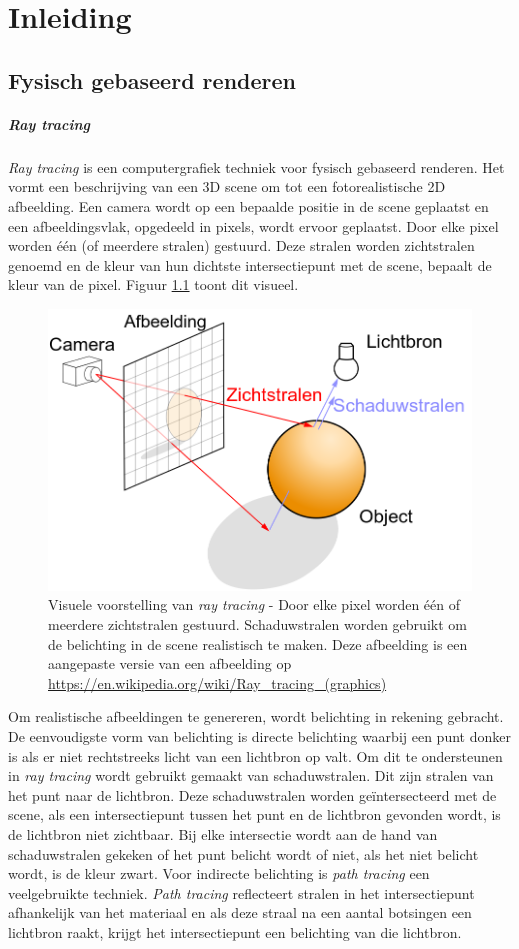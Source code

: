 \chapter{Inleiding}
\label{hoofdstuk:inleiding}

\section{Fysisch gebaseerd renderen}
\paragraph{Ray tracing}
\textit{Ray tracing} is een computergrafiek techniek voor fysisch gebaseerd renderen. Het vormt een beschrijving van een 3D scene om tot een fotorealistische 2D afbeelding. Een camera wordt op een bepaalde positie in de scene geplaatst en een afbeeldingsvlak, opgedeeld in pixels, wordt ervoor geplaatst. Door elke pixel worden één (of meerdere stralen) gestuurd. Deze stralen worden zichtstralen genoemd en de kleur van hun dichtste intersectiepunt met de scene, bepaalt de kleur van de pixel. Figuur \ref{fig:raytracing} toont dit visueel.\\

\begin{figure}
    \centering
    \includegraphics[width=0.5\linewidth]{img/ray-tracing}
    \caption[Visuele voorstelling van \textit{ray tracing}]%
{Visuele voorstelling van \textit{ray tracing} - \small Door elke pixel worden één of meerdere zichtstralen gestuurd. Schaduwstralen worden gebruikt om de belichting in de scene realistisch te maken. Deze afbeelding is een aangepaste versie van een afbeelding op \url{https://en.wikipedia.org/wiki/Ray_tracing_(graphics)}}
    \label{fig:raytracing}    
\end{figure}

Om realistische afbeeldingen te genereren, wordt belichting in rekening gebracht. De eenvoudigste vorm van belichting is directe belichting waarbij een punt donker is als er niet rechtstreeks licht van een lichtbron op valt. Om dit te ondersteunen in \textit{ray tracing} wordt gebruikt gemaakt van schaduwstralen. Dit zijn stralen van het punt naar de lichtbron.  Deze schaduwstralen worden geïntersecteerd met de scene, als een intersectiepunt tussen het punt en de lichtbron gevonden wordt, is de lichtbron niet zichtbaar.  Bij elke intersectie wordt aan de hand van schaduwstralen gekeken of het punt belicht wordt of niet, als het niet belicht wordt, is de kleur zwart. Voor indirecte belichting is \textit{path tracing} een veelgebruikte techniek. \textit{Path tracing} reflecteert stralen in het intersectiepunt afhankelijk van het materiaal en als deze straal na een aantal botsingen een lichtbron raakt, krijgt het intersectiepunt een belichting van die lichtbron.    

